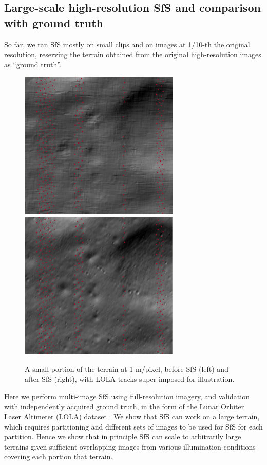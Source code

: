 \documentclass[12pt,oneside]{article}
\begin{document}
\subsection{Large-scale high-resolution SfS and comparison with ground truth}
\label{lola}
So far, we ran SfS mostly on small clips and on images at 1/10-th the original resolution,
reserving the terrain obtained from the original high-resolution images as
``ground truth''. 

\begin{figure}[h!]
\begin{center}
\includegraphics[width=3in]{figures/sfs_lola_before.jpg}
\includegraphics[width=3in]{figures/sfs_lola_after.jpg}
\caption[sfs]{A small portion of the terrain at 1 m/pixel, 
before SfS (left) and after SfS (right), with LOLA tracks super-imposed for illustration.}
\label{fig:sfslola}
\end{center}
\end{figure}

Here we perform multi-image SfS using full-resolution imagery, and
validation with independently acquired ground truth, in the form of the
Lunar Orbiter Laser Altimeter (LOLA) dataset \cite{zuber2010lunar}. We
show that SfS can work on a large terrain, which requires
partitioning and different sets of images to be used for SfS for each
partition.  Hence we show that in principle SfS can scale to arbitrarily
large terrains given sufficient overlapping images from various
illumination conditions covering each portion that terrain.
\end{document}
